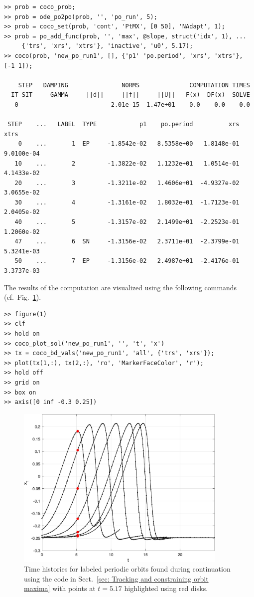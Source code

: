 \begin{lstlisting}[language=coco-highlight,frame=lines]
>> prob = coco_prob;
>> prob = ode_po2po(prob, '', 'po_run', 5);
>> prob = coco_set(prob, 'cont', 'PtMX', [0 50], 'NAdapt', 1);
>> prob = po_add_func(prob, '', 'max', @slope, struct('idx', 1), ...
     {'trs', 'xrs', 'xtrs'}, 'inactive', 'u0', 5.17);
>> coco(prob, 'new_po_run1', [], {'p1' 'po.period', 'xrs', 'xtrs'}, [-1 1]);

    STEP   DAMPING               NORMS              COMPUTATION TIMES
  IT SIT     GAMMA     ||d||     ||f||     ||U||   F(x)  DF(x)  SOLVE
   0                          2.01e-15  1.47e+01    0.0    0.0    0.0

 STEP    ...   LABEL  TYPE            p1    po.period          xrs         xtrs
    0    ...       1  EP     -1.8542e-02   8.5358e+00   1.8148e-01   9.0100e-04
   10    ...       2         -1.3822e-02   1.1232e+01   1.0514e-01   4.1433e-02
   20    ...       3         -1.3211e-02   1.4606e+01  -4.9327e-02   3.0655e-02
   30    ...       4         -1.3161e-02   1.8032e+01  -1.7123e-01   2.0405e-02
   40    ...       5         -1.3157e-02   2.1499e+01  -2.2523e-01   1.2060e-02
   47    ...       6  SN     -1.3156e-02   2.3711e+01  -2.3799e-01   5.3241e-03
   50    ...       7  EP     -1.3156e-02   2.4987e+01  -2.4176e-01   3.3737e-03
\end{lstlisting}
The results of the computation are visualized using the following commands (cf.\ Fig.~\ref{fig: Section7_4_2}).
\begin{lstlisting}[language=coco-highlight,frame=lines]
>> figure(1)
>> clf
>> hold on
>> coco_plot_sol('new_po_run1', '', 't', 'x')
>> tx = coco_bd_vals('new_po_run1', 'all', {'trs', 'xrs'});
>> plot(tx(1,:), tx(2,:), 'ro', 'MarkerFaceColor', 'r');
>> hold off
>> grid on
>> box on
>> axis([0 inf -0.3 0.25])
\end{lstlisting}
\begin{figure}[h]
\centering
\includegraphics[width=4in]{Figures/Section7_4_2.jpg}
\caption{Time histories for labeled periodic orbits found during continuation using the code in Sect.~\ref{sec: Tracking and constraining orbit maxima} with points at $t=5.17$ highlighted using red disks.}
\label{fig: Section7_4_2}
\end{figure}

